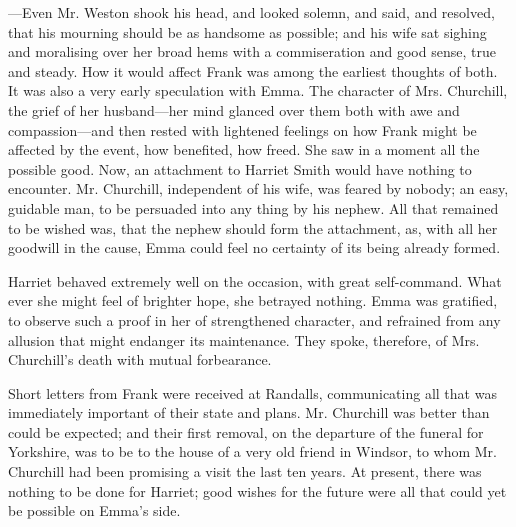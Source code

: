 ---Even Mr. Weston shook his head, and looked solemn, and said,  and resolved, that his mourning should be as handsome as possible; and his wife sat sighing and moralising over her broad hems with a commiseration and good sense, true and steady. How it would affect Frank was among the earliest thoughts of both. It was also a very early speculation with Emma. The character of Mrs. Churchill, the grief of her husband---her mind glanced over them both with awe and compassion---and then rested with lightened feelings on how Frank might be affected by the event, how benefited, how freed. She saw in a moment all the possible good. Now, an attachment to Harriet Smith would have nothing to encounter. Mr. Churchill, independent of his wife, was feared by nobody; an easy, guidable man, to be persuaded into any thing by his nephew. All that remained to be wished was, that the nephew should form the attachment, as, with all her goodwill in the cause, Emma could feel no certainty of its being already formed.

Harriet behaved extremely well on the occasion, with great self-command. What ever she might feel of brighter hope, she betrayed nothing. Emma was gratified, to observe such a proof in her of strengthened character, and refrained from any allusion that might endanger its maintenance. They spoke, therefore, of Mrs. Churchill's death with mutual forbearance.

Short letters from Frank were received at Randalls, communicating all that was immediately important of their state and plans. Mr. Churchill was better than could be expected; and their first removal, on the departure of the funeral for Yorkshire, was to be to the house of a very old friend in Windsor, to whom Mr. Churchill had been promising a visit the last ten years. At present, there was nothing to be done for Harriet; good wishes for the future were all that could yet be possible on Emma's side.


